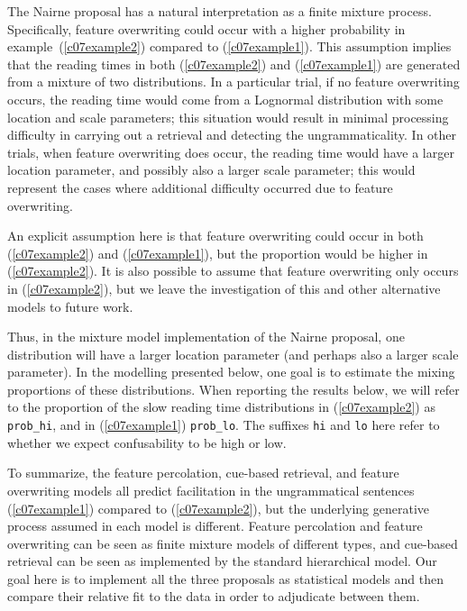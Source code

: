 \documentclass{cambridge7A}\usepackage[]{graphicx}\usepackage[]{color}
\begin{document}
The Nairne proposal has a natural interpretation as a finite mixture process. Specifically, feature overwriting could occur with a higher probability in example~(\ref{c07example2}) compared to (\ref{c07example1}). This assumption implies that the reading times in both (\ref{c07example2}) and (\ref{c07example1}) are generated from a mixture of two distributions. 
In a particular trial, if no feature overwriting occurs, the reading time would come from a Lognormal distribution with some location and scale parameters; this situation would result in 
minimal processing difficulty in  carrying out a retrieval and detecting the ungrammaticality. In other trials,
when feature overwriting does occur, 
the reading time would have a larger location parameter, and possibly also a larger scale parameter; this would represent the cases where additional difficulty occurred due to feature overwriting. 

An explicit assumption here is that feature overwriting could occur in both (\ref{c07example2}) and (\ref{c07example1}), but the proportion would be higher in (\ref{c07example2}). It is also possible to assume that feature overwriting only occurs in 
(\ref{c07example2}), but we leave the investigation of this and other alternative models to future work. 

Thus, in the mixture model implementation of the Nairne proposal, one distribution will have a larger location parameter (and perhaps also a larger scale parameter).
In the modelling presented below, one goal is to estimate the mixing proportions of these distributions.
When reporting the results below, we will refer to the proportion of the slow reading time distributions in (\ref{c07example2}) as \texttt{prob\_hi}, and in (\ref{c07example1}) \texttt{prob\_lo}. The suffixes \texttt{hi} and \texttt{lo} here refer to whether we expect confusability to be high or low.

To summarize, the feature percolation, cue-based retrieval, and 
feature overwriting models all predict facilitation in the ungrammatical sentences (\ref{c07example1}) compared to (\ref{c07example2}), but the underlying generative process assumed in each model is different. Feature percolation and feature overwriting can be seen as finite mixture models of different types, and cue-based retrieval can be seen as implemented by the standard hierarchical model.
Our goal here is to implement all the three proposals as statistical models and then compare their relative fit to the data in order to adjudicate between them.
\end{document}

